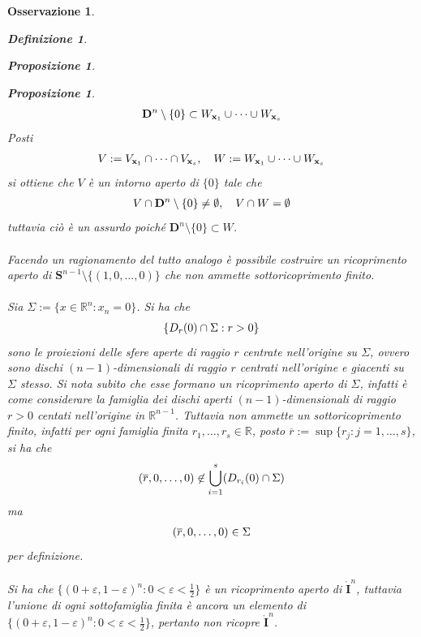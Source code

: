 \documentclass[oneside, 11pt]{amsbook}
\makeatletter
\newcommand{\0}{{(0)}}
\newcommand{\3}{{(3)}}
\theoremstyle{colonplain}
\newtheorem{prop}[thm]{Proposizione}
\theoremstyle{colondefinition}
\newtheorem{defn}[thm]{Definizione}
\theoremstyle{colonremark}
\newtheorem{rmk}[thm]{Osservazione}
\numberwithin{equation}{chapter}
\renewcommand{\proofname}{Dimostrazione}
\renewenvironment{proof}[1][\proofname]{\par
  \pushQED{\end{proof}}%
  \normalfont \topsep6\p@\@plus6\p@\relax
  \trivlist
  \item[\hskip\labelsep\bfseries #1:]\ignorespaces
}{%
  \popQED\endtrivlist\@endpefalse
}
\makeatother
\begin{document}
\begin{rmk}
\begin{defn}
\begin{prop}
\begin{prop}
\begin{proof}[Soluzione]
\begin{align}
    \mathbf{D}^n \setminus \{ 0 \} \subset W_{\mathbf{x}_1} \cup \dots \cup W_{\mathbf{x}_s} \notag
\end{align}
Posti
\begin{align}
    V := V_{\mathbf{x}_1} \cap \dots \cap V_{\mathbf{x}_s}, \quad W := W_{\mathbf{x}_1} \cup \dots \cup W_{\mathbf{x}_s} \notag
\end{align}
si ottiene che $V$ è un intorno aperto di $\{ 0 \}$ tale che
\begin{align}
    V \cap \mathbf{D}^n \setminus \{ 0 \} \neq \emptyset, \quad V \cap W = \emptyset \notag
\end{align}
tuttavia ciò è un assurdo poiché $\mathbf{D}^n \setminus \{ 0 \} \subset W$. \\ \\
Facendo un ragionamento del tutto analogo è possibile costruire un ricoprimento aperto di $\mathbf{S}^{n - 1} \setminus \{ (1, 0, \dots, 0) \}$ che non ammette sottoricoprimento finito. \\ \\
Sia $\Sigma := \{ x \in \mathbb{R}^n : x_n = 0 \}$. Si ha che
\begin{align}
    \{ D_r(0) \cap \Sigma : r > 0 \} \notag
\end{align}
sono le proiezioni delle sfere aperte di raggio $r$ centrate nell'origine su $\Sigma$, ovvero sono dischi $(n - 1)$-dimensionali di raggio $r$ centrati nell'origine e giacenti su $\Sigma$ stesso. Si nota subito che esse formano un ricoprimento aperto di $\Sigma$, infatti è come considerare la famiglia dei dischi aperti $(n - 1)$-dimensionali di raggio $r > 0$ centati nell'origine in $\mathbb{R}^{n - 1}$. Tuttavia non ammette un sottoricoprimento finito, infatti per ogni famiglia finita $r_1, \dots, r_s \in \mathbb{R}$, posto $\overline{r} := \sup \{ r_j : j = 1, \dots, s \}$, si ha che
\begin{align}
    (\overline{r}, 0, \dots, 0) \not\in \bigcup_{i = 1}^s (D_{r_i}(0) \cap \Sigma) \notag
\end{align}
ma
\begin{align}
    (\overline{r}, 0, \dots, 0) \in \Sigma \notag
\end{align}
per definizione. \\ \\
Si ha che $\{ (0 + \varepsilon, 1 - \varepsilon)^n : 0 < \varepsilon < \frac{1}{2} \}$ è un ricoprimento aperto di $\mathring{\mathbf{I}}^n$, tuttavia l'unione di ogni sottofamiglia finita è ancora un elemento di $\{ (0 + \varepsilon, 1 - \varepsilon)^n : 0 < \varepsilon < \frac{1}{2} \}$, pertanto non ricopre $\mathring{\mathbf{I}}^n$.

\end{proof}
\end{prop}
\end{prop}
\end{defn}
\end{rmk}
\end{document}
